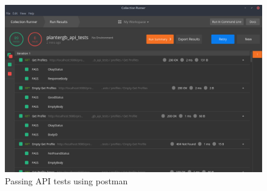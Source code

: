 \documentclass[onecolumn, draftclsnofoot,10pt, compsoc]{IEEEtran}
\begin{document}
		\begin{center}
			\begin{figure}[H]
				\includegraphics[width=\linewidth]{tests/api_tests.png}
				\caption{Passing API tests using postman}
				\label{fig:apiTests}
			\end{figure}
		\end{center}
\end{document}
